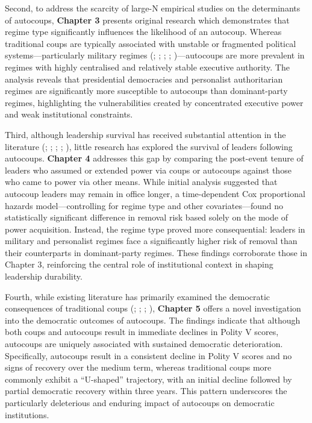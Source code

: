 \documentclass[
  12pt,
]{report}
\begin{document}
Second, to address the scarcity of large-N empirical studies on the
determinants of autocoups, \textbf{Chapter 3} presents original research
which demonstrates that regime type significantly influences the
likelihood of an autocoup. Whereas traditional coups are typically
associated with unstable or fragmented political systems---particularly
military regimes (;
;
;
;
)---autocoups are more
prevalent in regimes with highly centralised and relatively stable
executive authority. The analysis reveals that presidential democracies
and personalist authoritarian regimes are significantly more susceptible
to autocoups than dominant-party regimes, highlighting the
vulnerabilities created by concentrated executive power and weak
institutional constraints.

Third, although leadership survival has received substantial attention
in the literature (; ;
;
;
), little research has explored the survival of leaders following
autocoups. \textbf{Chapter 4} addresses this gap by comparing the
post-event tenure of leaders who assumed or extended power via coups or
autocoups against those who came to power via other means. While initial
analysis suggested that autocoup leaders may remain in office longer, a
time-dependent Cox proportional hazards model---controlling for regime
type and other covariates---found no statistically significant
difference in removal risk based solely on the mode of power
acquisition. Instead, the regime type proved more consequential: leaders
in military and personalist regimes face a significantly higher risk of
removal than their counterparts in dominant-party regimes. These
findings corroborate those in Chapter 3, reinforcing the central role of
institutional context in shaping leadership durability.

Fourth, while existing literature has primarily examined the democratic
consequences of traditional coups (; ; ;
), \textbf{Chapter 5}
offers a novel investigation into the democratic outcomes of autocoups.
The findings indicate that although both coups and autocoups result in
immediate declines in Polity V scores, autocoups are uniquely associated
with sustained democratic deterioration. Specifically, autocoups result
in a consistent decline in Polity V scores and no signs of recovery over
the medium term, whereas traditional coups more commonly exhibit a
``U-shaped'' trajectory, with an initial decline followed by partial
democratic recovery within three years. This pattern underscores the
particularly deleterious and enduring impact of autocoups on democratic
institutions.
\end{document}
